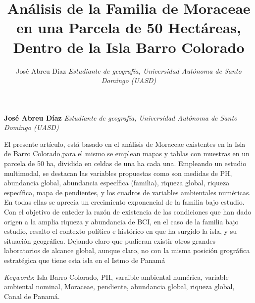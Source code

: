 \documentclass[11pt,]{article}
\title{Análisis de la Familia de Moraceae en una Parcela de 50 Hectáreas,
Dentro de la Isla Barro Colorado  }
\author{\Large José Abreu Díaz\vspace{0.05in} \newline\normalsize\emph{Estudiante de geografía, Universidad Autónoma de Santo Domingo (UASD)}  }
\date{}
\newcommand*{\authorfont}{\fontfamily{phv}\selectfont}
\renewenvironment{abstract}
 {{%
    \setlength{\leftmargin}{0mm}
    \setlength{\rightmargin}{\leftmargin}%
  }%
  \relax}
 {\endlist}
\begin{document}
	
%

{%
\setlength{\parindent}{0pt}
\thispagestyle{plain}
{\fontsize{18}{20}\selectfont\raggedright 
\maketitle  %

}

{
   \vskip 13.5pt\relax \normalsize\fontsize{11}{12} 
\textbf{\authorfont José Abreu Díaz} \hskip 15pt \emph{\small Estudiante de geografía, Universidad Autónoma de Santo Domingo (UASD)}   

}

}








\begin{abstract}

    \hbox{\vrule height .2pt width 39.14pc}

    \vskip 8.5pt %

\noindent El presente artículo, está basado en el análisis de Moraceae existentes
en la Isla de Barro Colorado,para el mismo se emplean mapas y tablas con
muestras en un parcela de 50 ha, dividida en celdas de una ha cada una.
Empleando un estudio multimodal, se destacan las variables propuestas
como son medidas de PH, abundancia global, abundancia específica
(familia), riqueza global, riqueza específica, mapa de pendientes, y los
cuadros de variables ambientales numéricas. En todas ellas se aprecia un
crecimiento exponencial de la familia bajo estudio. Con el objetivo de
enteder la razón de existencia de las condiciones que han dado origen a
la amplia riqueza y abundancia de BCI, en el caso de la familia bajo
estudio, resalto el contexto político e histórico en que ha surgido la
isla, y su situación geográfica. Dejando claro que pudieran existir
otros grandes laboratorios de alcance global, aunque claro, no con la
misma posición grográfica estratégica que tiene esta isla en el Istmo de
Panamá


\vskip 8.5pt \noindent \emph{Keywords}: Isla Barro Colorado, PH, varaible ambiental numérica, variable ambiental
nominal, Moraceae, pendiente, abundancia global, riqueza global, Canal
de Panamá. \par

    \hbox{\vrule height .2pt width 39.14pc}



\end{abstract}
\end{document}
